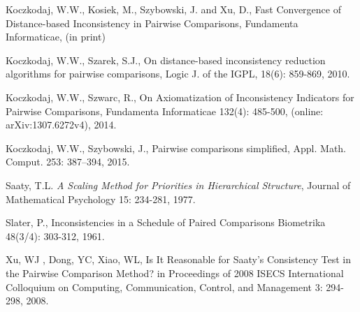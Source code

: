 \documentclass [12pt]{article}
\theoremstyle{definition}
\begin{document}
\begin{thebibliography}{9}
Koczkodaj, W.W., Kosiek, M., Szybowski, J. and Xu, D., Fast Convergence of Distance-based Inconsistency in Pairwise Comparisons, Fundamenta Informaticae, (in print)




 Koczkodaj, W.W., Szarek, S.J., On distance-based inconsistency reduction algorithms for pairwise comparisons, Logic J. of the IGPL, 18(6): 859-869, 2010.

Koczkodaj, W.W., Szwarc, R., On Axiomatization of Inconsistency Indicators for Pairwise Comparisons, Fundamenta Informaticae 132(4): 485-500,  (online: arXiv:1307.6272v4), 2014.

Koczkodaj, W.W., Szybowski, J., Pairwise comparisons simplified, Appl. Math. Comput. 253: 387--394, 2015.




Saaty, T.L. {\it A Scaling Method for Priorities in Hierarchical Structure}, Journal of Mathematical Psychology 15: 234-281, 1977.

Slater, P., Inconsistencies in a Schedule of Paired Comparisons
Biometrika 48(3/4): 303-312,  1961.

Xu, WJ , Dong, YC, Xiao, WL, Is It Reasonable for Saaty's Consistency
Test in the Pairwise Comparison Method? in Proceedings of 2008 ISECS
International Colloquium on Computing, Communication, Control, and
Management 3: 294-298, 2008.



\end{thebibliography}
\end{document}
